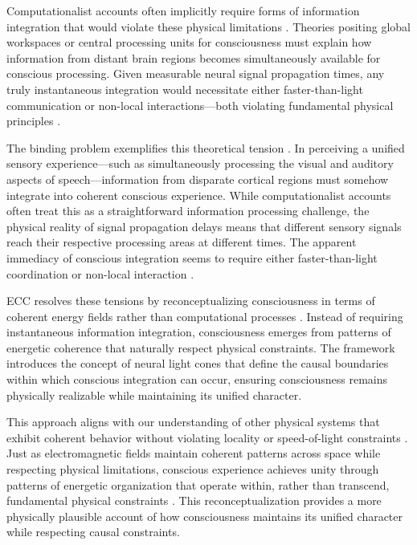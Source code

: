 \begin{refsection}
Computationalist accounts often implicitly require forms of information integration that would violate these physical limitations \cite{searle1980minds}. Theories positing global workspaces or central processing units for consciousness must explain how information from distant brain regions becomes simultaneously available for conscious processing. Given measurable neural signal propagation times, any truly instantaneous integration would necessitate either faster-than-light communication or non-local interactions—both violating fundamental physical principles \cite{piccinini2015physical}.

The binding problem exemplifies this theoretical tension \cite{maturana1980autopoiesis}. In perceiving a unified sensory experience—such as simultaneously processing the visual and auditory aspects of speech—information from disparate cortical regions must somehow integrate into coherent conscious experience. While computationalist accounts often treat this as a straightforward information processing challenge, the physical reality of signal propagation delays means that different sensory signals reach their respective processing areas at different times. The apparent immediacy of conscious integration seems to require either faster-than-light coordination or non-local interaction \cite{harnad1990symbol}.

ECC resolves these tensions by reconceptualizing consciousness in terms of coherent energy fields rather than computational processes \cite{bickhard1995foundational}. Instead of requiring instantaneous information integration, consciousness emerges from patterns of energetic coherence that naturally respect physical constraints. The framework introduces the concept of neural light cones that define the causal boundaries within which conscious integration can occur, ensuring consciousness remains physically realizable while maintaining its unified character.

This approach aligns with our understanding of other physical systems that exhibit coherent behavior without violating locality or speed-of-light constraints \cite{dreyfus1972what}. Just as electromagnetic fields maintain coherent patterns across space while respecting physical limitations, conscious experience achieves unity through patterns of energetic organization that operate within, rather than transcend, fundamental physical constraints \cite{fodor2000mind}. This reconceptualization provides a more physically plausible account of how consciousness maintains its unified character while respecting causal constraints.


\end{refsection}
